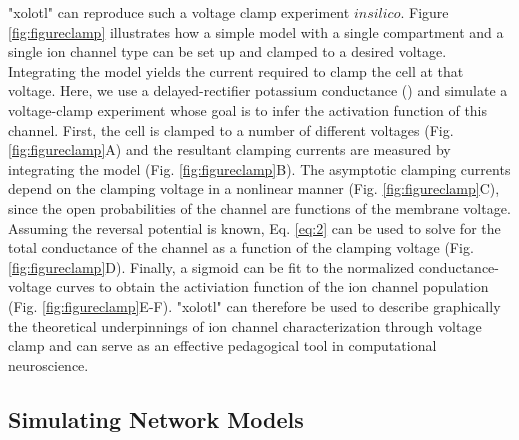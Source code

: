 \documentclass{frontiersSCNS} %
\begin{document}
"xolotl" can reproduce such a voltage clamp experiment $in silico$. Figure \ref{fig:figureclamp} illustrates how a simple model with a single compartment and a single ion channel type can be set up and clamped to a desired voltage.  Integrating the model yields the current required to clamp the cell at that voltage. Here, we use a delayed-rectifier potassium conductance (\cite{liuModelNeuronActivitydependent1998}) and simulate a voltage-clamp experiment whose goal is to infer the activation function of this channel. First, the cell is clamped to a number of different voltages (Fig. \ref{fig:figureclamp}A) and the resultant clamping currents are measured by integrating the model (Fig. \ref{fig:figureclamp}B). The asymptotic clamping currents depend on the clamping voltage in a nonlinear manner (Fig. \ref{fig:figureclamp}C), since the open probabilities of the channel are functions of the membrane voltage. Assuming the reversal potential is known, Eq. \eqref{eq:2} can be used to solve for the total conductance of the channel as a function of the clamping voltage (Fig. \ref{fig:figureclamp}D). Finally, a sigmoid can be fit to the normalized conductance-voltage curves to obtain the activiation function of the ion channel population (Fig. \ref{fig:figureclamp}E-F). "xolotl" can therefore be used to describe graphically the theoretical underpinnings of ion channel characterization through voltage clamp and can serve as an effective pedagogical tool in computational neuroscience.


%
%
%
%
%
%



\subsection{Simulating Network Models}
\end{document}
